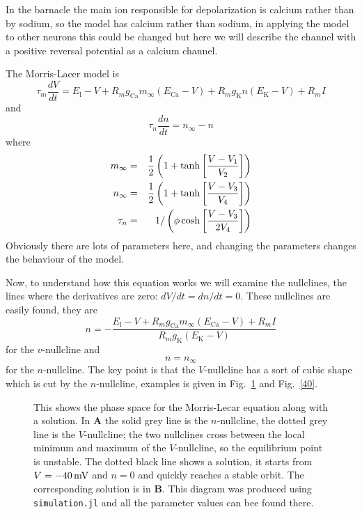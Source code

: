 \documentclass[12pt]{article}
\newcommand{\mV}{\mbox{\,mV}}
\begin{document}
In the barnacle the main ion responsible for depolarization is calcium
rather than by sodium, so the model has calcium rather than sodium, in
applying the model to other neurons this could be changed but here we
will describe the channel with a positive reversal potential as a
calcium channel.

The Morris-Lacer model is
\begin{equation}
\tau_m\frac{dV}{dt}=E_{\text{l}}-V+R_mg_{\text{Ca}}m_\infty(E_{\text{Ca}} -V)+R_mg_{\text{K}}n(E_{\text{K}} -V)+R_mI
\end{equation}
and
\begin{equation}
\tau_n\frac{dn}{dt}=n_\infty-n
\end{equation}
where
\begin{eqnarray}
m_\infty&=&\frac{1}{2}\left(1+\tanh\left[\frac{V-V_1}{V_2}\right]\right)\cr
n_\infty&=&\frac{1}{2}\left(1+\tanh\left[\frac{V-V_3}{V_4}\right]\right)\cr
\tau_n&=&1/\left(\phi\cosh\left[\frac{V-V_3}{2V_4}\right]\right)
\end{eqnarray}
Obviously there are lots of parameters here, and changing the
parameters changes the behaviour of the model.

Now, to understand how this equation works we will examine the
nullclines, the lines where the derivatives are zero:
$dV/dt=dn/dt=0$. These nullclines are easily found, they are
\begin{equation}
n=-\frac{E_{\text{l}}-V+R_mg_{\text{Ca}}m_\infty(E_{\text{Ca}} -V)+R_mI}{R_mg_{\text{K}}(E_{\text{K}} -V)}
\end{equation}
for the $v$-nullcline and 
\begin{equation}
n=n_\infty
\end{equation}
for the $n$-nullcline. The key point is that the $V$-nullcline has a
sort of cubic shape which is cut by the
$n$-nullcline, examples is given in Fig.~\ref{60} and Fig.~\ref{40}.

\begin{figure}
\begin{center}
  
\end{center}
\caption{This shows the phase space for the Morris-Lecar equation
  along with a solution. In \textbf{A} the solid grey line is the
  $n$-nullcline, the dotted grey line is the $V$-nullcline; the two
  nullclines cross between the local minimum and maximum of the
  $V$-nullcline, so the equilibrium point is unstable. The dotted
  black line shows a solution, it starts from $V=-40\mV$ and $n=0$ and
  quickly reaches a stable orbit. The corresponding solution is in
  \textbf{B}. This diagram was produced using \texttt{simulation.jl}
  and all the parameter values can bee found there. \label{60}}
\end{figure}
\end{document}
